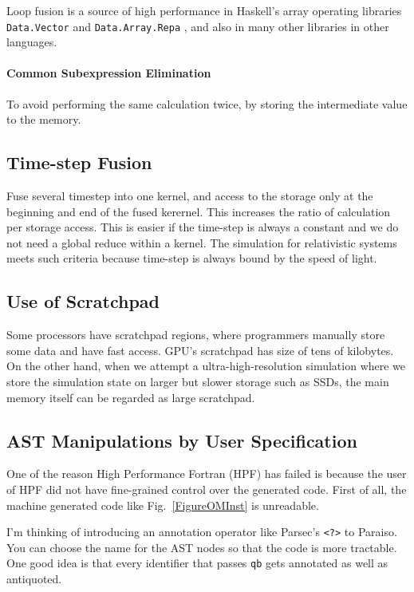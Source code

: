 \documentclass[twocolumn]{article}
\begin{document}
Loop fusion is a source of high performance in Haskell's array operating
libraries {\tt Data.Vector} and {\tt Data.Array.Repa}
\cite{Keller:2010:RSP:1932681.1863582}, and also in many other libraries in
other languages.


\paragraph{Common Subexpression Elimination}

To avoid performing the same calculation twice, by storing the intermediate
value to the memory. 

\subsection{Time-step Fusion}

Fuse several timestep into one kernel, and access to the storage only at the
beginning and end of the fused kerernel. This increases the ratio of
calculation per storage access. This is easier if the time-step is always a
constant and we do not need a global reduce within a kernel. The simulation
for relativistic systems meets such criteria because time-step is always bound
by the speed of light.

\subsection{Use of Scratchpad}

Some processors have scratchpad regions, where programmers manually store some
data and have fast access. GPU's scratchpad has size of tens of kilobytes. On
the other hand, when we attempt a ultra-high-resolution simulation where we
store the simulation state on larger but slower storage such as SSDs, the main
memory itself can be regarded as large scratchpad. 


\subsection{AST Manipulations by User Specification}
One of the reason High Performance Fortran (HPF) has failed
\cite{Kennedy:2007:RFH:1238844.1238851} is because the user of HPF did not
have fine-grained control over the generated code.  First of all, the machine
generated code like Fig.~\ref{FigureOMInst} is unreadable.

I'm thinking of introducing an annotation operator like Parsec's {\tt <?>} to
Paraiso. You can choose the name for the AST nodes so that the code is more
tractable. One good idea is that every identifier that passes {\tt qb} gets
annotated as well as antiquoted.
\end{document}

